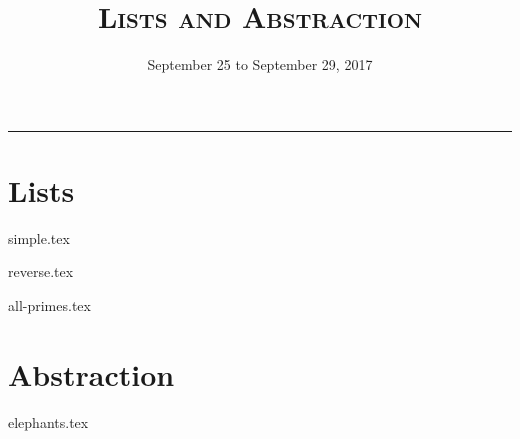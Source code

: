 \documentclass{exam}
\title{\textsc{Lists and Abstraction}}
\date{September 25 to September 29, 2017}
\begin{document}
\maketitle
\rule{\textwidth}{0.15em}
\fontsize{12}{15}\selectfont


\section{Lists}
\begin{questions}
{simple.tex}

\begin{blocksection}
{reverse.tex}
\end{blocksection}

\begin{blocksection}
{all-primes.tex}
\end{blocksection}

\section{Abstraction}
{elephants.tex}

\end{questions}
\end{document}
